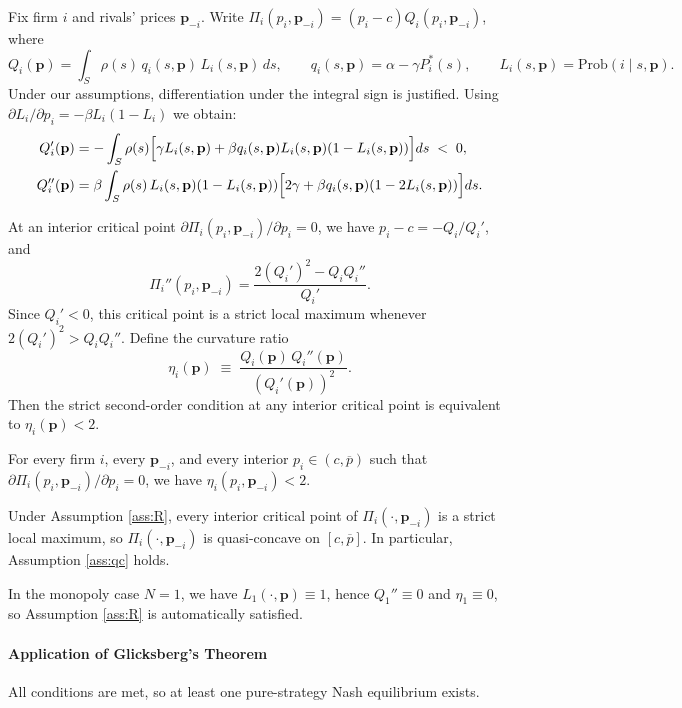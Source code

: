 \documentclass{article}
\begin{document}
Fix firm $i$ and rivals' prices $\mathbf{p}_{-i}$. Write $\Pi_i(p_i,\mathbf{p}_{-i}) = (p_i-c)Q_i(p_i,\mathbf{p}_{-i})$, where
\[
  Q_i(\mathbf{p}) = \int_S \rho(s)\,q_i(s,\mathbf{p})\,L_i(s,\mathbf{p})\,ds,
  \qquad
  q_i(s,\mathbf{p}) = \alpha - \gamma P_i^*(s),
  \qquad
  L_i(s,\mathbf{p}) = \mathrm{Prob}(i\mid s,\mathbf{p}).
\]
Under our assumptions, differentiation under the integral sign is justified. Using $\partial L_i/\partial p_i = -\beta L_i(1-L_i)$ we obtain:
\begin{align*}
  Q_i'(\mathbf{p})
  &= -\int_S \rho(s)\Bigl[\gamma L_i(s,\mathbf{p}) + \beta q_i(s,\mathbf{p})L_i(s,\mathbf{p})(1-L_i(s,\mathbf{p}))\Bigr]ds
  \;<\;0,\\
  Q_i''(\mathbf{p})
  &= \beta\int_S \rho(s)\,L_i(s,\mathbf{p})(1-L_i(s,\mathbf{p}))\Bigl[2\gamma + \beta q_i(s,\mathbf{p})(1-2L_i(s,\mathbf{p}))\Bigr]ds.
\end{align*}

At an interior critical point $\partial \Pi_i(p_i,\mathbf{p}_{-i})/\partial p_i = 0$, we have $p_i-c = -Q_i/Q_i'$, and
\[
  \Pi_i''(p_i,\mathbf{p}_{-i}) = \frac{2(Q_i')^2 - Q_i Q_i''}{Q_i'}.
\]
Since $Q_i'<0$, this critical point is a strict local maximum whenever $2(Q_i')^2 > Q_i Q_i''$. Define the curvature ratio
\[
  \eta_i(\mathbf{p}) \;\equiv\; \frac{Q_i(\mathbf{p})\,Q_i''(\mathbf{p})}{(Q_i'(\mathbf{p}))^2}.
\]
Then the strict second-order condition at any interior critical point is equivalent to $\eta_i(\mathbf{p}) < 2$.

\begin{assumption}\label{ass:R}
  For every firm $i$, every $\mathbf{p}_{-i}$, and every interior $p_i\in(c,\overline{p})$ such that
  $\partial \Pi_i(p_i,\mathbf{p}_{-i})/\partial p_i = 0$, we have $\eta_i(p_i,\mathbf{p}_{-i}) < 2$.
\end{assumption}
Under Assumption \ref{ass:R}, every interior critical point of $\Pi_i(\cdot,\mathbf{p}_{-i})$ is a strict local maximum, so
$\Pi_i(\cdot,\mathbf{p}_{-i})$ is quasi-concave on $[c,\overline{p}]$. In particular, Assumption \ref{ass:qc} holds.

\begin{remark}
  In the monopoly case $N=1$, we have $L_1(\cdot,\mathbf{p})\equiv 1$, hence $Q_1''\equiv 0$ and $\eta_1\equiv 0$, so Assumption
  \ref{ass:R} is automatically satisfied.
\end{remark}

\paragraph{Application of Glicksberg's Theorem}
All conditions are met, so at least one pure-strategy Nash equilibrium exists.
\end{document}
